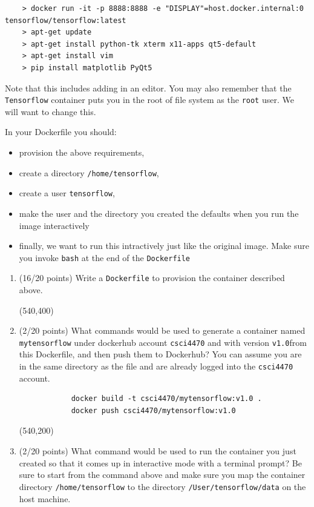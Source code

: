 \documentclass[10pt]{article}
\begin{document}
\begin{enumerate}
\begin{lstlisting}
	> docker run -it -p 8888:8888 -e "DISPLAY"=host.docker.internal:0 tensorflow/tensorflow:latest
	> apt-get update
	> apt-get install python-tk xterm x11-apps qt5-default
	> apt-get install vim
	> pip install matplotlib PyQt5
\end{lstlisting}

Note that this includes adding in an editor.  You may also remember that the \verb*|Tensorflow| container puts you in the root of  file system as the \verb*|root| user. We will want to change this. 

In your Dockerfile you should:
\begin{itemize} 
	\item provision the above requirements, 
	\item create a directory \verb*|/home/tensorflow|, 
	\item create a user \verb*|tensorflow|,
	\item make the user and the directory you created the defaults when you run the image interactively 
	\item finally, we want to run this intractively just like the original image. Make sure you invoke \verb*|bash| at the end of the \verb*|Dockerfile|
\end{itemize}

	\begin{enumerate} 
		\item (16/20 points) Write a \verb|Dockerfile| to provision the container described above.

\beginanswers

\else
\hspace*{-0.4in}\framebox(540,400){}
\fi

\item (2/20 points) What commands would be used to generate a container named \verb|mytensorflow| under dockerhub account \verb*|csci4470| and with version \verb*|v1.0|from this Dockerfile, and then push them to Dockerhub? 
	You can assume you are in
	the same directory as the file and are already logged into the \verb*|csci4470| account.

\beginanswers
			\begin{lstlisting}
			docker build -t csci4470/mytensorflow:v1.0 .
			docker push csci4470/mytensorflow:v1.0
			\end{lstlisting}
\else
\hspace*{-0.4in}\framebox(540,200){}
\fi

\item (2/20 points) What command would be used to run the container you just created so that it 
	comes up in interactive mode with a terminal prompt? Be sure to start from the command above and make sure you map the container directory \verb*|/home/tensorflow| to the directory \verb*|/User/tensorflow/data| on the host machine.


\end{enumerate}
\end{enumerate}
\end{document}
